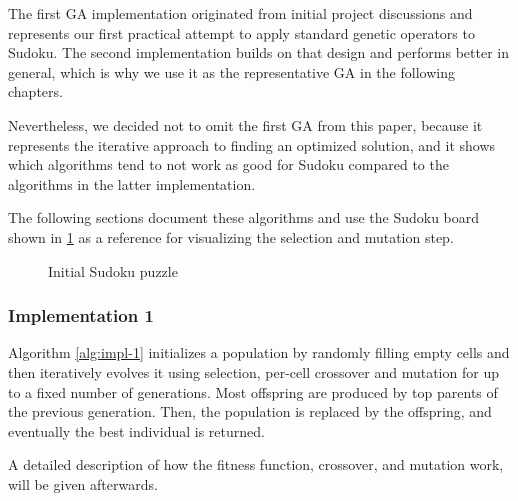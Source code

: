 The first GA implementation originated from initial project discussions and represents our first practical attempt to apply standard genetic operators to Sudoku. The second implementation builds on that design and performs better in general, which is why we use it as the representative GA in the following chapters.

Nevertheless, we decided not to omit the first GA from this paper, because it represents the iterative approach to finding an optimized solution, and it shows which algorithms tend to not work as good for Sudoku compared to the algorithms in the latter implementation.

The following sections document these algorithms and use the Sudoku board shown in \ref{fig:initial-sudoku} as a reference for visualizing the selection and mutation step.

\begin{figure}[H]
\centering
{}
\caption{Initial Sudoku puzzle}
\label{fig:initial-sudoku}
\end{figure}

\subsubsection{Implementation 1}\label{sec:impl-1}
Algorithm \ref{alg:impl-1} initializes a population by randomly filling empty cells and then iteratively evolves it using selection, per-cell crossover and mutation for up to a fixed number of generations.
Most offspring are produced by top parents of the previous generation. Then, the population is replaced by the offspring, and eventually the best individual is returned.

A detailed description of how the fitness function, crossover, and mutation work, will be given afterwards.


